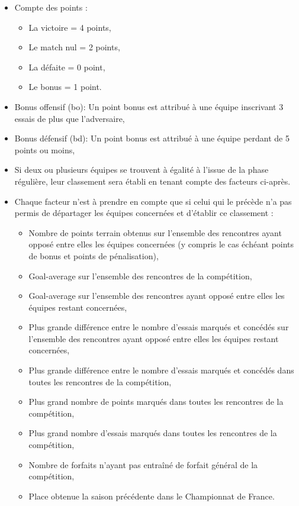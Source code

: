 \begin{itemize}
 \item Compte des points :
	\begin{itemize}
 		\item La victoire = 4 points,
 		\item Le match nul = 2 points,
 		\item La défaite = 0 point,
 		\item Le bonus = 1 point.
\end{itemize} 
 \item Bonus offensif (bo): Un point bonus est attribué à une équipe inscrivant 3 essais de plus que l'adversaire,
 \item Bonus défensif (bd): Un point bonus est attribué à une équipe perdant de 5 points ou moins,
 \item Si deux ou plusieurs équipes se trouvent à égalité à l'issue de la phase régulière, leur classement sera établi en tenant compte des facteurs ci-après.
 \item Chaque facteur n'est à prendre en compte que si celui qui le précède n'a pas permis de départager les équipes concernées et d'établir ce classement :
\begin{itemize}
 \item Nombre de points terrain obtenus sur l'ensemble des rencontres ayant opposé entre elles les équipes concernées (y compris le cas échéant points de bonus et points de pénalisation),
 \item Goal-average sur l'ensemble des rencontres de la compétition,
 \item Goal-average sur l'ensemble des rencontres ayant opposé entre elles les équipes restant concernées,
 \item Plus grande différence entre le nombre d'essais marqués et concédés sur l'ensemble des rencontres ayant opposé entre elles les équipes restant concernées,
 \item Plus grande différence entre le nombre d'essais marqués et concédés dans toutes les rencontres de la compétition,
 \item Plus grand nombre de points marqués dans toutes les rencontres de la compétition,
 \item Plus grand nombre d'essais marqués dans toutes les rencontres de la compétition,
 \item Nombre de forfaits n'ayant pas entraîné de forfait général de la compétition,
 \item Place obtenue la saison précédente dans le Championnat de France.
\end{itemize} 
\end{itemize} 
 

\clearpage


\ifdef{\public}{}{}

\inputminted{python}{Code/I-TD11.py}


 
 
